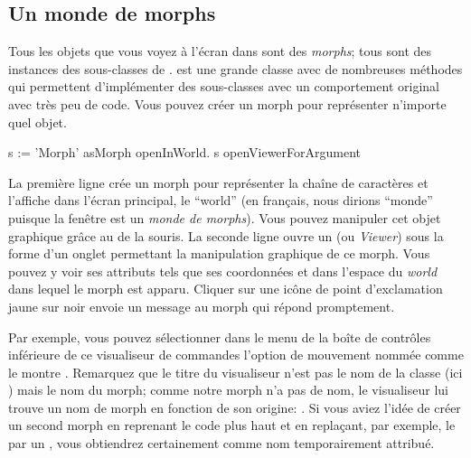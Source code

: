 \documentclass[a4paper,10pt,twoside]{book}
\begin{document}
\subsection{Un monde de morphs}
Tous les objets que vous voyez \`a l'écran dans \sq sont des
\emph{morphs}; tous sont des instances des sous-classes de .
\mbox{} est une grande classe avec de nombreuses méthodes
qui permettent d'implémenter des sous-classes avec un comportement
original avec très peu de code.
Vous pouvez créer un morph pour représenter n'importe quel objet. 


\begin{code}{}
s := 'Morph' asMorph openInWorld.
s openViewerForArgument
\end{code}

La première ligne crée un morph pour représenter la chaîne
de caractères  et l'affiche dans
l'écran principal, le ``world'' (en français, nous dirions
``monde'' puisque la fenêtre \sq est un \emph{monde de morphs}).
Vous pouvez manipuler cet objet graphique grâce au 
de la souris.
La seconde ligne ouvre un  (ou
\emph{Viewer}) sous la forme d'un onglet
permettant la manipulation graphique de ce morph. Vous pouvez y voir
ses attributs tels que ses coordonnées  et  dans
l'espace du \emph{world} dans lequel le morph est apparu.
Cliquer sur une icône de point d'exclamation jaune sur noir envoie un
message au morph qui répond promptement.

Par exemple, vous pouvez sélectionner dans le menu de la boîte de
contrôles inférieure de ce visualiseur de commandes l'option de
mouvement nommée  comme le montre .
Remarquez que le titre du visualiseur n'est pas le nom de la classe
(ici \mbox{)} mais le nom du morph; comme notre morph n'a pas
de nom, le visualiseur lui trouve un nom de morph en fonction de son
origine: . Si vous aviez l'idée de créer un second
morph en reprenant le code plus haut et en replaçant, par exemple,
le  par un , vous obtiendrez certainement  comme nom
temporairement attribué.
\end{document}
